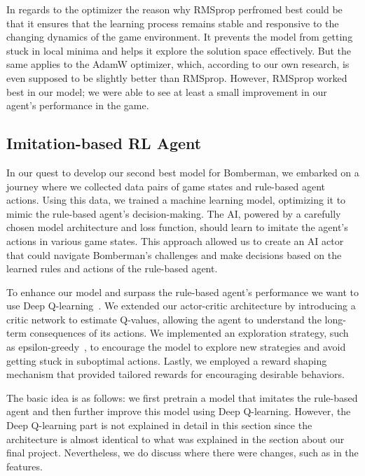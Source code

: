In regards to the optimizer the reason why RMSprop perfromed best could be that it ensures that the learning process remains stable and responsive to the changing dynamics 
of the game environment. It prevents the model from getting stuck in local minima and helps it explore the solution space effectively.
But the same applies to the AdamW optimizer, which, according to our own research, is even supposed to be slightly better than RMSprop. 
However, RMSprop worked best in our model; we were able to see at least a small improvement in our agent's performance in the game.

\newpage
{}
\subsection{Imitation-based RL Agent}

In our quest to develop our second best model for Bomberman, we embarked on a journey where we collected data pairs of game 
states and rule-based agent actions. Using this data, we trained a machine learning model, optimizing it to mimic 
the rule-based agent's decision-making. The AI, powered by a carefully chosen model architecture and loss function, 
should learn to imitate the agent's actions in various game states. This approach allowed us to create an AI actor 
that could navigate Bomberman's challenges and make decisions based on the learned rules and actions of the rule-based agent.

To enhance our model and surpass the rule-based agent's performance we want to use Deep Q-learning~\cite{Art:torchQlearn}. We extended our actor-critic architecture by 
introducing a critic network to estimate Q-values, allowing the agent to understand the long-term consequences of its actions. 
We implemented an exploration strategy, such as epsilon-greedy~\cite{Onl:greedy}, to encourage the model to explore new strategies and avoid getting 
stuck in suboptimal actions. Lastly, we employed a reward shaping mechanism that provided tailored rewards for encouraging desirable behaviors.

The basic idea is as follows: we first pretrain a model that imitates the rule-based agent and then further improve this model using Deep Q-learning. 
However, the Deep Q-learning part is not explained in detail in this section since the architecture is almost identical to what was explained in the 
section about our final project. Nevertheless, we do discuss where there were changes, such as in the features.

